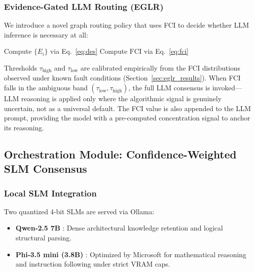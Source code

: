 \documentclass[conference, 10pt]{IEEEtran}
\begin{document}
\subsubsection{Evidence-Gated LLM Routing (EGLR)}
\label{sec:eglr}
We introduce a novel graph routing policy that uses FCI to decide whether LLM inference is necessary at all:

\begin{algorithm}[H]
\SetAlgoLined
{}
Compute $\{E_i\}$ via Eq.~\eqref{eq:des}\;
Compute $\text{FCI}$ via Eq.~\eqref{eq:fci}\;
\caption{Evidence-Gated LLM Routing (EGLR)}
\end{algorithm}

\noindent Thresholds $\tau_{\text{high}}$ and $\tau_{\text{low}}$ are calibrated empirically from the FCI distributions observed under known fault conditions (Section~\ref{sec:eglr_results}). When FCI falls in the ambiguous band $(\tau_{\text{low}}, \tau_{\text{high}})$, the full LLM consensus is invoked—LLM reasoning is applied only where the algorithmic signal is genuinely uncertain, not as a universal default. The FCI value is also appended to the LLM prompt, providing the model with a pre-computed concentration signal to anchor its reasoning.

\subsection{Orchestration Module: Confidence-Weighted SLM Consensus}
\label{sec:consensus}
\subsubsection{Local SLM Integration}
Two quantized 4-bit SLMs are served via Ollama:
\begin{itemize}
    \item \textbf{Qwen-2.5 7B} \cite{qwen}: Dense architectural knowledge retention and logical structural parsing.
    \item \textbf{Phi-3.5 mini (3.8B)} \cite{phi}: Optimized by Microsoft for mathematical reasoning and instruction following under strict VRAM caps.
\end{itemize}
\end{document}
